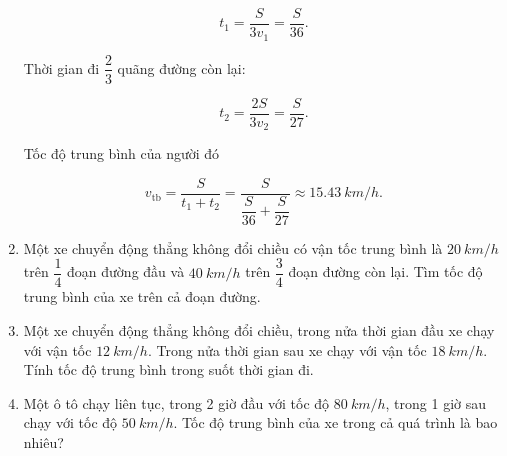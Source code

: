 \begin{enumerate}[label=\bfseries Bài \arabic*:]
{		$$t_1 = \dfrac{S}{3v_1} = \dfrac{S}{36}.$$
		
		Thời gian đi $\dfrac{2}{3}$ quãng đường còn lại:
		
		$$t_2 = \dfrac{2S}{3v_2} = \dfrac{S}{27}.$$
		
		Tốc độ trung bình của người đó
		
		$$v_\text{tb} = \dfrac{S}{t_1 + t_2} = \dfrac{S}{\dfrac{S}{36} + \dfrac{S}{27}} \approx \SI{15,43}{km/h}.$$
	}
	\item {}
	
	{
		
		Một xe chuyển động thẳng không đổi chiều có vận tốc trung bình là $\SI{20}{km/h}$ trên $\dfrac{1}{4}$ đoạn đường đầu và $\SI{40}{km/h}$ trên $\dfrac{3}{4}$ đoạn đường còn lại. Tìm tốc độ trung bình của xe trên cả đoạn đường.
	}
	\item {}
	
	{
		
		Một xe chuyển động thẳng không đổi chiều, trong nửa thời gian đầu xe chạy với vận tốc $\SI{12}{km/h}$. Trong nửa thời gian sau xe chạy với vận tốc $\SI{18}{km/h}$. Tính tốc độ trung bình trong suốt thời gian đi.
	}
	\item {}
	
	{
		
		Một ô tô chạy liên tục, trong 2 giờ đầu với tốc độ $\SI{80}{km/h}$, trong 1 giờ sau chạy với tốc độ $\SI{50}{km/h}$. Tốc độ trung bình của xe trong cả quá trình là bao nhiêu?
	}
\end{enumerate}